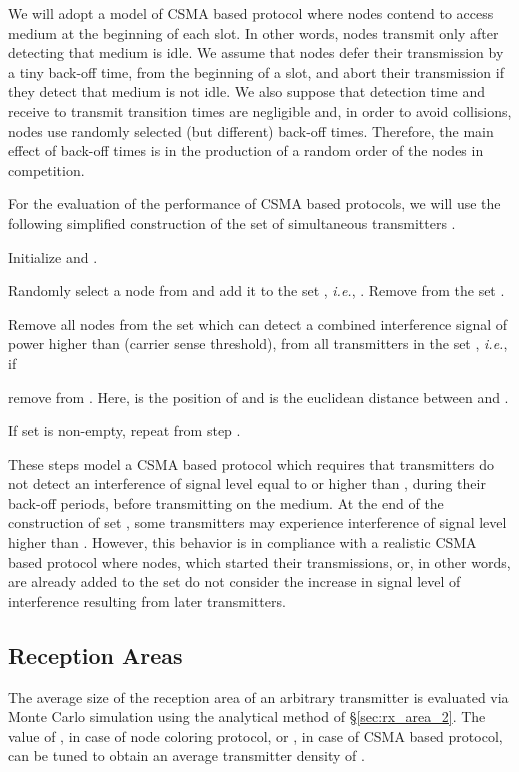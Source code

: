 \documentclass[12pt,english]{article}
\begin{document}
We will adopt a model of CSMA based protocol where nodes contend to access medium at the beginning of each slot. In other words, nodes transmit only after detecting that medium is idle. We assume that nodes defer their transmission by a tiny back-off time, from the beginning of a slot, and abort their transmission if they detect that medium is not idle. We also suppose that detection time and receive to transmit transition times are negligible and, in order to avoid collisions, nodes use randomly selected (but different) back-off times. Therefore, the main effect of back-off times is in the production of a random order of the nodes in competition.  

For the evaluation of the performance of CSMA based protocols, we will use the following simplified construction of the set of simultaneous transmitters . 
\begin{compactenum}
\item Initialize  and .
\item Randomly select a node  from  and add it to the set , {\it i.e.}, . Remove  from the set .
\item Remove all nodes from the set  which can detect a combined interference signal of power higher than  (carrier sense threshold), from all transmitters in the set , {\it i.e.}, if 
 
remove  from . Here,  is the position of  and  is the euclidean distance between  and .
\item If set  is non-empty, repeat from step .
\end{compactenum}
These steps model a CSMA based protocol which requires that transmitters do not detect an interference of signal level equal to or higher than , during their back-off periods, before transmitting on the medium. At the end of the construction of set , some transmitters may experience interference of signal level higher than . However, this behavior is in compliance with a realistic CSMA based protocol where nodes, which started their transmissions, or, in other words, are already added to the set  do not consider the increase in signal level of interference resulting from later transmitters.

\subsection{Reception Areas} 

The average size of the reception area of an arbitrary transmitter is evaluated via Monte Carlo simulation using the analytical method of \S \ref{sec:rx_area_2}. The value of , in case of node coloring protocol, or , in case of CSMA based protocol, can be tuned to obtain an average transmitter density of . 
\end{document}
